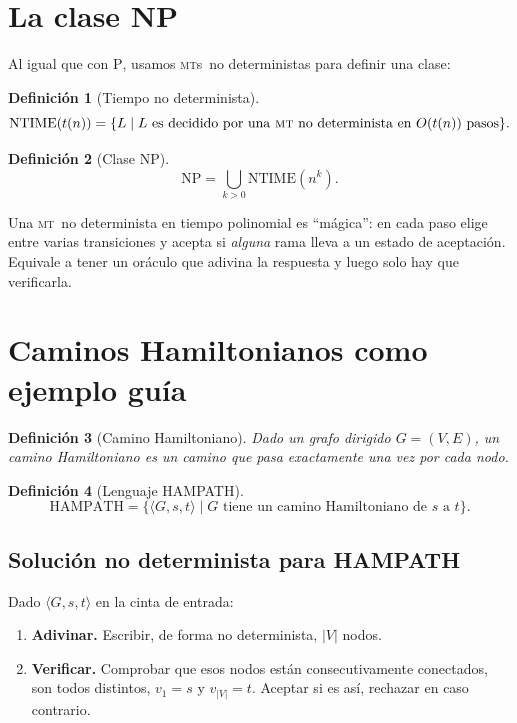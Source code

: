 \documentclass[11pt,a4paper]{article}
\theoremstyle{definicion}
\newtheorem{definicion}{Definici\'on}[section]
\newcommand{\MT}{\textsc{mt}}
\newcommand{\MTs}{\textsc{mt}s}
\newcommand{\enc}[1]{\langle #1 \rangle}
\newcommand{\NP}{\mathrm{NP}}
\newcommand{\Pclass}{\mathrm{P}}
\newcommand{\NTIME}{\mathrm{NTIME}}
\begin{document}
\section{La clase NP}

Al igual que con $\Pclass$, usamos \MTs\ no deterministas para definir una clase:

\begin{definicion}[Tiempo no determinista]
\[
\NTIME(t(n)) = \{ L \mid L \text{ es decidido por una \MT\ no determinista en } O(t(n)) \text{ pasos}\}.
\]
\end{definicion}

\begin{definicion}[Clase $\NP$]
\[
\NP = \bigcup_{k > 0} \NTIME(n^k).
\]
\end{definicion}

\begin{intuicion}
Una \MT\ no determinista en tiempo polinomial es ``m\'agica'': en cada paso elige entre varias transiciones y acepta si \emph{alguna} rama lleva a un estado de aceptaci\'on. Equivale a tener un or\'aculo que adivina la respuesta y luego solo hay que verificarla.
\end{intuicion}

\section{Caminos Hamiltonianos como ejemplo gu\'ia}

\begin{definicion}[Camino Hamiltoniano]
Dado un grafo dirigido $G = (V, E)$, un camino Hamiltoniano es un camino que pasa \emph{exactamente una vez} por cada nodo.
\end{definicion}

\begin{definicion}[Lenguaje HAMPATH]
\[
\mathrm{HAMPATH} = \{ \enc{G, s, t} \mid G \text{ tiene un camino Hamiltoniano de } s \text{ a } t\}.
\]
\end{definicion}

\subsection{Soluci\'on no determinista para HAMPATH}

Dado $\enc{G, s, t}$ en la cinta de entrada:
\begin{enumerate}
    \item \textbf{Adivinar.} Escribir, de forma no determinista, $|V|$ nodos.
    \item \textbf{Verificar.} Comprobar que esos nodos est\'an consecutivamente conectados, son todos distintos, $v_1 = s$ y $v_{|V|} = t$. Aceptar si es as\'i, rechazar en caso contrario.
\end{enumerate}
\end{document}
